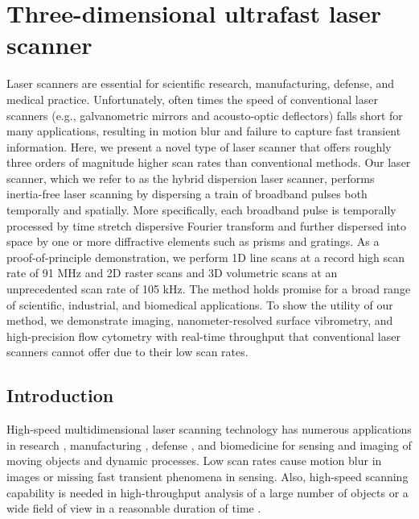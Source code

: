 \chapter{Three-dimensional ultrafast laser scanner}
\label{chp:PW2013_Chapter}

Laser scanners are essential for scientific research, manufacturing, defense, and medical practice. Unfortunately, often times the speed of conventional laser scanners (e.g., galvanometric mirrors and acousto-optic deflectors) falls short for many applications, resulting in motion blur and failure to capture fast transient information. Here, we present a novel type of laser scanner that offers roughly three orders of magnitude higher scan rates than conventional methods. Our laser scanner, which we refer to as the hybrid dispersion laser scanner, performs inertia-free laser scanning by dispersing a train of broadband pulses both temporally and spatially. More specifically, each broadband pulse is temporally processed by time stretch dispersive Fourier transform and further dispersed into space by one or more diffractive elements such as prisms and gratings. As a proof-of-principle demonstration, we perform 1D line scans at a record high scan rate of 91 MHz and 2D raster scans and 3D volumetric scans at an unprecedented scan rate of 105 kHz. The method holds promise for a broad range of scientific, industrial, and biomedical applications. To show the utility of our method, we demonstrate imaging, nanometer-resolved surface vibrometry, and high-precision flow cytometry with real-time throughput that conventional laser scanners cannot offer due to their low scan rates.

\section{Introduction}

High-speed multidimensional laser scanning technology has numerous applications in research \cite{marshall2011handbook,fujii2005laser,dotson2003fundamentals,popescu2006optical,gobel2006imaging,pawley2010handbook,denk1990two,wandinger2005lidar}, manufacturing \cite{marshall2011handbook,fujii2005laser,dotson2003fundamentals,schwarz2010mapping,sinha2010vibration,pelesko2002modeling,osten2006optical,horn1986robot}, defense \cite{marshall2011handbook,fujii2005laser,schwarz2010mapping,sinha2010vibration,horn1986robot}, and biomedicine\cite{marshall2011handbook, popescu2006optical,gobel2006imaging,pawley2010handbook,denk1990two,hoffman2006confocal,tarnok2002clinical,vacca2009laser} for sensing and imaging of moving objects and dynamic processes. Low scan rates cause motion blur in images or missing fast transient phenomena in sensing. Also, high-speed scanning capability is needed in high-throughput analysis of a large number of objects or a wide field of view in a reasonable duration of time \cite{marshall2011handbook,fujii2005laser,dotson2003fundamentals,wandinger2005lidar,horn1986robot,hoffman2006confocal,tarnok2002clinical,vacca2009laser,mahjoubfar2011high}.

